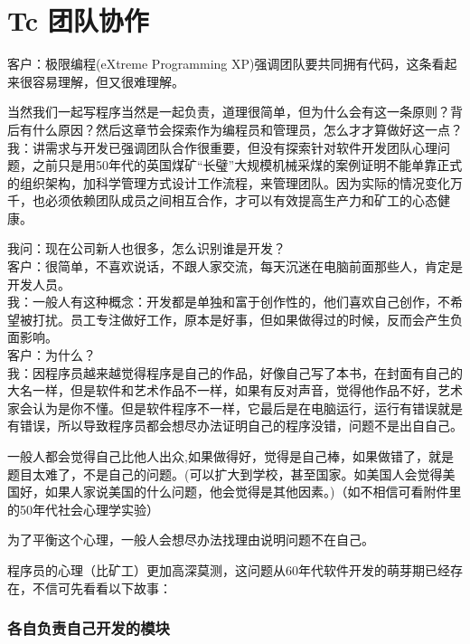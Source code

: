 \chapter{Tc 团队协作} %

客户：极限编程(eXtreme Programming
XP)强调团队要共同拥有代码，这条看起来很容易理解，但又很难理解。

当然我们一起写程序当然是一起负责，道理很简单，但为什么会有这一条原则？背后有什么原因？然后这章节会探索作为编程员和管理员，怎么才才算做好这一点？\\

我：讲需求与开发已强调团队合作很重要，但没有探索针对软件开发团队心理问题，之前只是用50年代的英国煤矿``长璧''大规模机械采煤的案例证明不能单靠正式的组织架构，加科学管理方式设计工作流程，来管理团队。因为实际的情况变化万千，也必须依赖团队成员之间相互合作，才可以有效提高生产力和矿工的心态健康。

我问：现在公司新人也很多，怎么识别谁是开发？\\
客户：很简单，不喜欢说话，不跟人家交流，每天沉迷在电脑前面那些人，肯定是开发人员。\\
我：一般人有这种概念：开发都是单独和富于创作性的，他们喜欢自己创作，不希望被打扰。员工专注做好工作，原本是好事，但如果做得过的时候，反而会产生负面影响。\\
客户：为什么？\\
我：因程序员越来越觉得程序是自己的作品，好像自己写了本书，在封面有自己的大名一样，但是软件和艺术作品不一样，如果有反对声音，觉得他作品不好，艺术家会认为是你不懂。但是软件程序不一样，它最后是在电脑运行，运行有错误就是有错误，所以导致程序员都会想尽办法证明自己的程序没错，问题不是出自自己。

一般人都会觉得自己比他人出众,如果做得好，觉得是自己棒，如果做错了，就是题目太难了，不是自己的问题。(可以扩大到学校，甚至国家。如美国人会觉得美国好，如果人家说美国的什么问题，他会觉得是其他因素。)（如不相信可看附件里的50年代社会心理学实验）

为了平衡这个心理，一般人会想尽办法找理由说明问题不在自己。

程序员的心理（比矿工）更加高深莫测，这问题从60年代软件开发的萌芽期已经存在，不信可先看看以下故事：

\hypertarget{ux5404ux81eaux8d1fux8d23ux81eaux5df1ux5f00ux53d1ux7684ux6a21ux5757}{%
\subsection{各自负责自己开发的模块}\label{ux5404ux81eaux8d1fux8d23ux81eaux5df1ux5f00ux53d1ux7684ux6a21ux5757}}

